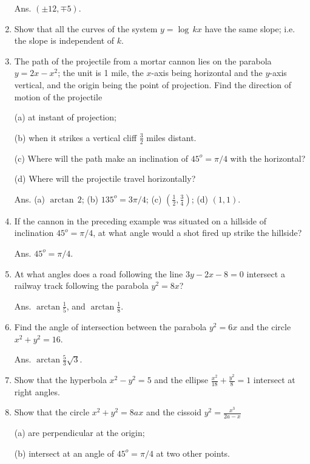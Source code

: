 \begin{enumerate}
Ans. $(\pm 12, \mp 5)$.

\item
Show that all the curves of the system 
$y = \log\, kx$ have the same slope; i.e. the slope is independent of $k$.

\item
The path of the projectile from a mortar cannon 
lies on the parabola $y = 2x - x^2$; the unit is 1 mile, %
the $x$-axis %
being horizontal and %
the $y$-axis %
vertical, and the origin being the point of projection. 
Find the direction of motion of the projectile

(a) at instant of projection;

(b) when it strikes a vertical cliff $\frac{3}{2}$ miles distant.

(c) Where will the path make an inclination of $45^o=\pi/4$ 
with the horizontal?

(d) Where will the projectile travel horizontally?

Ans. (a) $\arctan\, 2$; (b) $135^o=3\pi/4$; 
(c) $(\frac{1}{2}, \frac{3}{4})$; (d) $(1, 1)$.

\item
If the cannon in the preceding example was situated on a 
hillside of inclination $45^o=\pi/4$, at what angle would 
a shot fired up strike the hillside? 

Ans. $45^o=\pi/4$.

\item
At what angles does a road following the line 
$3y - 2x - 8 = 0$ intersect a railway track following the 
parabola $y^2 = 8x$? 

Ans. $\arctan \frac{1}{5}$, and $\arctan \frac{1}{8}$.

\item
Find the angle of intersection between the parabola $y^2 = 6x$ 
and the circle $x^2 + y^2 = 16$. 

Ans. $\arctan \frac{5}{3} \sqrt{3}$.

\item
Show that the hyperbola $x^2 - y^2 = 5$ and the ellipse 
$\frac{x^2}{18} + \frac{y^2}{8} = 1$ intersect at right angles.

\item
Show that the circle $x^2 + y^2 = 8ax$ and the cissoid 
$y^2 = \frac{x^3}{2a - x}$

(a) are perpendicular at the origin;

(b) intersect at an angle of $45^o=\pi/4$ at two other points.


\end{enumerate}

